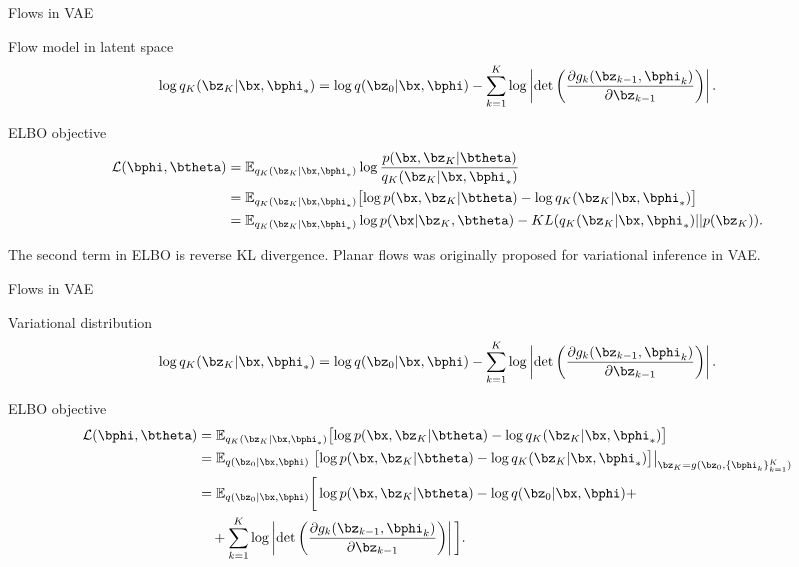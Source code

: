 \begin{frame}{Flows in VAE}
	\begin{block}{Flow model in latent space}
		\vspace{-0.7cm}
		\[
			\log q_K(\bz_K | \bx, \bphi_*) = \log q(\bz_0 | \bx, \bphi) - \sum_{k=1}^K \log \left| \det \left( \frac{\partial g_k(\bz_{k - 1}, \bphi_k)}{\partial \bz_{k-1}} \right) \right|.
		\]
		\vspace{-0.5cm}
	\end{block}
	\begin{block}{ELBO objective}
		\vspace{-0.5cm}
		\begin{align*}
			\mathcal{L} (\bphi, \btheta)  &= \mathbb{E}_{q_K(\bz_K | \bx, \bphi_*)} \log \frac{p(\bx, \bz_K | \btheta)}{q_K(\bz_K| \bx, \bphi_*)} \\
			&= \mathbb{E}_{q_K(\bz_K | \bx, \bphi_*)} \bigl[\log p(\bx, \bz_K | \btheta) - \log q_K(\bz_K| \bx, \bphi_*) \bigr] \\ 
			&=  \mathbb{E}_{q_K(\bz_K | \bx, \bphi_*)} \log p(\bx | \bz_K, \btheta) - KL (q_K(\bz_K| \bx, \bphi_*) || p(\bz_K)).
		\end{align*}
	\end{block}
	The second term in ELBO is reverse KL divergence. Planar flows was originally proposed for variational inference in VAE.
\end{frame}
\begin{frame}{Flows in VAE}
	\begin{block}{Variational distribution}
		\vspace{-0.5cm}
		\[
			\log q_K(\bz_K | \bx, \bphi_*) = \log q(\bz_0 | \bx, \bphi) - \sum_{k=1}^K \log \left| \det \left( \frac{\partial g_k(\bz_{k - 1}, \bphi_k)}{\partial \bz_{k-1}} \right) \right|.
		\]
		\vspace{-0.5cm}
	\end{block}
	\begin{block}{ELBO objective}
		\vspace{-0.5cm}
		\begin{align*}
			\mathcal{L} (\bphi, \btheta) 
			&= \mathbb{E}_{q_K(\bz_K | \bx, \bphi_*)} \bigl[\log p(\bx, \bz_K | \btheta) - \log q_K(\bz_K| \bx, \bphi_*) \bigr] \\
			&= \mathbb{E}_{q(\bz_0 | \bx, \bphi)} \left. \bigl[\log p(\bx, \bz_K | \btheta) - \log q_K(\bz_K| \bx, \bphi_*) \bigr]\right|_{\bz_K = g(\bz_0, \{\bphi_k\}_{k=1}^K)} \\
			&= \mathbb{E}_{q(\bz_0 | \bx, \bphi)} \bigg[\log p(\bx, \bz_K | \btheta) -  \log q(\bz_0 | \bx, \bphi ) + \\ & \quad  + \sum_{k=1}^K \log \left| \det \left( \frac{\partial g_k(\bz_{k - 1}, \bphi_k)}{\partial \bz_{k-1}} \right) \right| \bigg].
		\end{align*}
	\end{block}
\end{frame}
